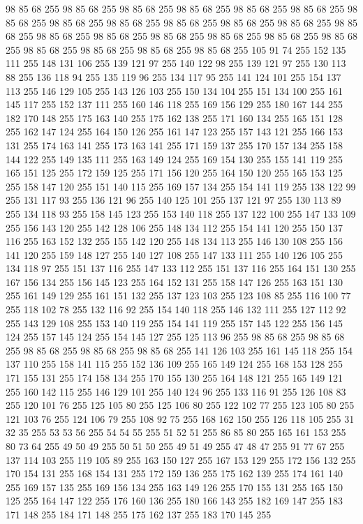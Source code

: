 98 85 68 255 98 85 68 255 98 85 68 255 98 85 68 255 98 85 68 255 98 85 68 255 98 85 68 255 98 85 68 255 98 85 68 255 98 85 68 255 98 85 68 255 98 85 68 255 98 85 68 255 98 85 68 255 98 85 68 255 98 85 68 255 98 85 68 255 98 85 68 255 98 85 68 255 98 85 68 255 98 85 68 255 98 85 68 255 98 85 68 255 105 91 74 255 152 135 111 255 148 131 106 255 139 121 97 255 140 122 98 255 139 121 97 255 130 113 88 255 136 118 94 255 135 119 96 255 134 117 95 255 141 124 101 255 154 137 113 255 146 129 105 255 143 126 103 255 150 134 104 255 151 134 100 255 161 145 117 255 152 137 111 255 160 146 118 255 169 156 129 255 180 167 144 255 182 170 148 255 175 163 140 255 175 162 138 255 171 160 134 255 165 151 128 255 162 147 124 255 164 150 126 255 161 147 123 255 157 143 121 255 166 153 131 255 174 163 141 255 173 163 141 255 171 159 137 255 170 157 134 255 158 144 122 255 149 135 111 255 163 149 124 255 169 154 130 255 155 141 119 255 165 151 125 255
172 159 125 255 171 156 120 255 164 150 120 255 165 153 125 255 158 147 120 255 151 140 115 255 169 157 134 255 154 141 119 255 138 122 99 255 131 117 93 255 136 121 96 255 140 125 101 255 137 121 97 255 130 113 89 255 134 118 93 255 158 145 123 255 153 140 118 255 137 122 100 255 147 133 109 255 156 143 120 255 142 128 106 255 148 134 112 255 154 141 120 255 150 137 116 255 163 152 132 255 155 142 120 255 148 134 113 255 146 130 108 255 156 141 120 255 159 148 127 255 140 127 108 255 147 133 111 255 140 126 105 255 134 118 97 255 151 137 116 255 147 133 112 255 151 137 116 255 164 151 130 255 167 156 134 255 156 145 123 255 164 152 131 255 158 147 126 255 163 151 130 255 161 149 129 255 161 151 132 255 137 123 103 255 123 108 85 255 116 100 77 255 118 102 78 255 132 116 92 255 154 140 118 255 146 132 111 255 127 112 92 255 143 129 108 255 153 140 119 255 154 141 119 255 157 145 122 255 156 145 124 255 157 145 124 255 154 145 127 255 125 113 96 255 98 85 68 255 98 85 68 255 98 85 68 255
98 85 68 255 98 85 68 255 141 126 103 255 161 145 118 255 154 137 110 255 158 141 115 255 152 136 109 255 165 149 124 255 168 153 128 255 171 155 131 255 174 158 134 255 170 155 130 255 164 148 121 255 165 149 121 255 160 142 115 255 146 129 101 255 140 124 96 255 133 116 91 255 126 108 83 255 120 101 76 255 125 105 80 255 125 106 80 255 122 102 77 255 123 105 80 255 121 103 76 255 124 106 79 255 108 92 75 255 168 162 150 255 126 118 105 255 31 32 35 255 53 53 56 255 54 54 55 255 51 52 51 255 86 85 80 255 165 161 153 255 80 73 64 255 49 50 49 255 50 51 50 255 49 51 49 255 47 48 47 255 91 77 67 255 137 114 103 255 119 105 89 255 163 150 127 255 167 153 129 255 172 156 132 255 170 154 131 255 168 154 131 255 172 159 136 255 175 162 139 255 174 161 140 255 169 157 135 255 169 156 134 255 163 149 126 255 170 155 131 255 165 150 125 255 164 147 122 255 176 160 136 255 180 166 143 255 182 169 147 255 183 171 148 255 184 171 148 255 175 162 137 255 183 170 145 255
